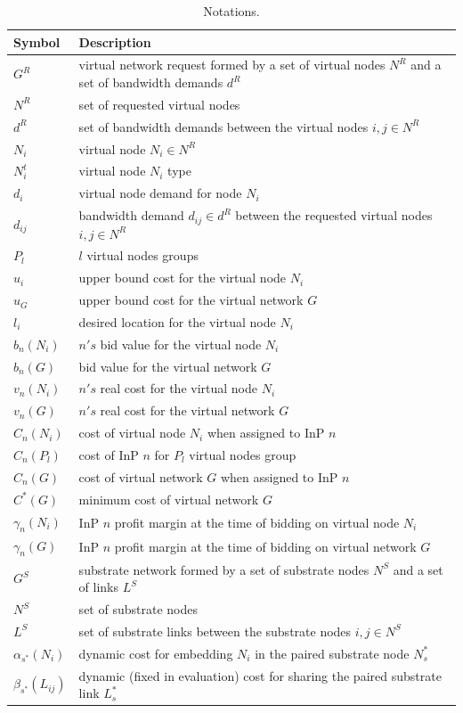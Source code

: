 \begin{table}[htbp]
	\myfloatalign \footnotesize
	\begin{tabular}{m{2cm} m{14cm}}
		\textbf{Symbol} & \textbf{Description}\\ 
		\hline
		$G^{R}$ & virtual network request formed by a set of virtual nodes $N^{R}$ and a set of bandwidth demands $d^{R}$  \\		$N^{R}$ & set of requested virtual nodes \\
		$d^{R}$ & set of bandwidth demands between the virtual nodes $i,j \in N^{R}$ \\
		$N_i$ & virtual node $N_i \in N^{R}$ \\
		$N^{t}_i$ & virtual node $N_i$ type \\
		$d_i$ & virtual node demand for node $N_i$ \\
		$d_{ij}$ & bandwidth demand $d_{ij} \in d^{R}$ between the requested virtual nodes $i,j \in N^{R}$ \\
		$P_l$ &  $l$ virtual nodes groups \\
		$u_{i}$ & upper bound cost for the virtual node $N_i$ \\
		$u_{G}$ & upper bound cost for the virtual network $G$ \\
		$l_{i}$ & desired location for the virtual node $N_i$ \\
		$b_n(N_i)$ & $n's$ bid value for the virtual node $N_i$ \\
		$b_n(G)$ & bid value for the virtual network $G$ \\
		$v_n(N_i)$ & $n's$ real cost for the virtual node $N_i$ \\
		$v_n(G)$ & $n's$ real cost for the virtual network $G$ \\
		$C_n(N_i)$ & cost of virtual node $N_i$ when assigned to InP $n$ \\
		$C_n(P_l)$ &  cost of InP $n$ for $P_l$ virtual nodes group \\
		$C_n(G)$ & cost of virtual network $G$ when assigned to InP $n$ \\
		$C^{*}(G)$ & minimum cost of virtual network $G$ \\
		$\gamma_n(N_i)$ & InP $n$ profit margin at the time of bidding on virtual node $N_i$ \\
		$\gamma_n(G)$ & InP $n$ profit margin at the time of bidding on virtual network $G$\\
		$G^{S}$ & substrate network formed by a set of substrate nodes $N^{S}$ and a set of links $L^{S}$\\
		$N^{S}$ & set of substrate nodes \\
		$L^{S}$ & set of substrate links between the substrate nodes $i,j \in N^{S}$ \\
		$\alpha_{s^{*}}(N_i)$ & dynamic cost for embedding $N_i$ in the paired substrate node $N_s^{*}$ \\
		$\beta_{s^{*}}(L_{ij})$ & dynamic (fixed in evaluation) cost for sharing the paired substrate link $L_s^{*}$ \\
		\hline
	\end{tabular}
	\caption{Notations.}
	\label{tab:notations}
\end{table}

